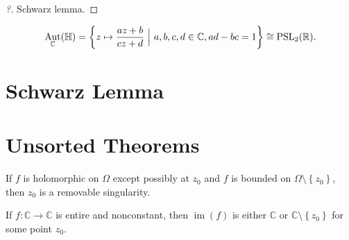 \begin{proof}[?]

Schwarz lemma.

\end{proof}

\begin{theorem}[?]

\begin{align*}
\mathop{\mathrm{Aut}}_{\mathbb{C}}({\mathbb{H}}) = \left\{{ z \mapsto {az+b \over cz+d} {~\mathrel{\Big|}~}a,b,c,d\in {\mathbb{C}}, ad-bc=1 }\right\} \cong{\operatorname{PSL}}_2({\mathbb{R}})
.\end{align*}

\end{theorem}


\hypertarget{schwarz-lemma}{%
\section{Schwarz Lemma}\label{schwarz-lemma}}






\hypertarget{unsorted-theorems}{%
\section{Unsorted Theorems}\label{unsorted-theorems}}

\begin{theorem}

If \(f\) is holomorphic on \(\Omega\) except possibly at \(z_0\) and
\(f\) is bounded on \(\Omega\setminus\left\{{z_0}\right\}\), then
\(z_0\) is a removable singularity.

\end{theorem}

\begin{theorem}

If \(f:{\mathbb{C}}\to {\mathbb{C}}\) is entire and nonconstant, then
\(\operatorname{im}(f)\) is either \({\mathbb{C}}\) or
\({\mathbb{C}}\setminus\left\{{z_0}\right\}\) for some point \(z_0\).

\end{theorem}

